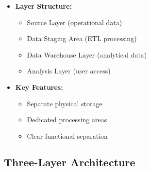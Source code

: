 \begin{itemize}
    \item \textbf{Layer Structure:}
        \begin{itemize}
            \item Source Layer (operational data)
            \item Data Staging Area (ETL processing)
            \item Data Warehouse Layer (analytical data)
            \item Analysis Layer (user access)
        \end{itemize}
    \item \textbf{Key Features:}
        \begin{itemize}
            \item Separate physical storage
            \item Dedicated processing areas
            \item Clear functional separation
        \end{itemize}
\end{itemize}


\subsection{Three-Layer Architecture}

